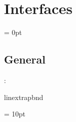 
\section{Interfaces} 


\parskip = 0pt

\vspace{3mm} \subsection*{General}

: 

linextrapbnd
\vspace{2mm}

\vspace{5mm}\parskip = 10pt 
